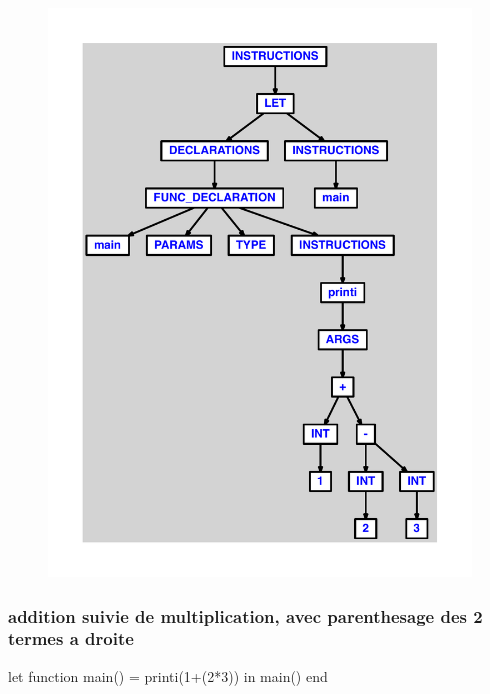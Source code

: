 \documentclass{article}
\begin{document}
\begin{figure}[H]\centering\includegraphics[max width=\textwidth]{ast/ast_88.pdf}\end{figure}\subsubsection{addition suivie de multiplication, avec parenthesage des 2 termes a droite}
\begin{verbatimtab}
let function main() = printi(1+(2*3)) in main() end
\end{verbatimtab}
\end{document}
